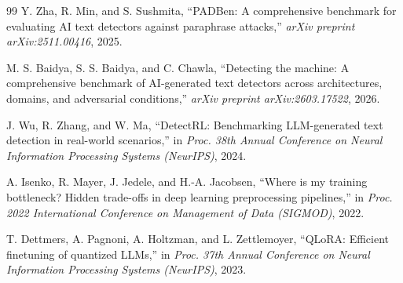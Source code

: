 \documentclass[conference]{IEEEtran}
\begin{document}
\begin{thebibliography}{99}
Y. Zha, R. Min, and S. Sushmita,
``PADBen: A comprehensive benchmark for evaluating AI text detectors against
paraphrase attacks,''
\textit{arXiv preprint arXiv:2511.00416}, 2025.



M. S. Baidya, S. S. Baidya, and C. Chawla,
``Detecting the machine: A comprehensive benchmark of AI-generated text
detectors across architectures, domains, and adversarial conditions,''
\textit{arXiv preprint arXiv:2603.17522}, 2026.



J. Wu, R. Zhang, and W. Ma,
``DetectRL: Benchmarking LLM-generated text detection in real-world
scenarios,''
in \textit{Proc. 38th Annual Conference on Neural Information Processing
Systems (NeurIPS)}, 2024.



A. Isenko, R. Mayer, J. Jedele, and H.-A. Jacobsen,
``Where is my training bottleneck? Hidden trade-offs in deep learning
preprocessing pipelines,''
in \textit{Proc. 2022 International Conference on Management of Data
(SIGMOD)}, 2022.



T. Dettmers, A. Pagnoni, A. Holtzman, and L. Zettlemoyer,
``QLoRA: Efficient finetuning of quantized LLMs,''
in \textit{Proc. 37th Annual Conference on Neural Information Processing
Systems (NeurIPS)}, 2023.



\end{thebibliography}
\end{document}
